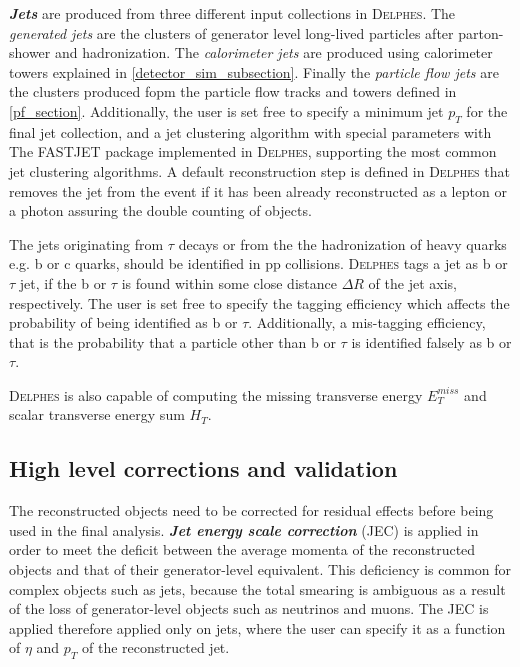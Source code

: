 {\emph{\bf{Jets}} are produced from three different input collections in \textsc{Delphes}. The \emph{generated jets} are the clusters of generator level long-lived particles after parton- shower and hadronization. The \emph{calorimeter jets} are produced using calorimeter towers explained in \autoref{detector_sim_subsection}. Finally the \emph{particle flow jets} are the clusters produced fopm the particle flow tracks and towers defined in \autoref{pf_section}. Additionally, the user is set free to specify a minimum jet $p_T$ for the final jet collection, and a jet clustering algorithm with special parameters with The FASTJET package \cite{Cacciari2012} implemented in \textsc{Delphes}, supporting the most common jet clustering algorithms. A default reconstruction step is defined in \textsc{Delphes} that removes the jet from the event if it has been already reconstructed as a lepton or a photon assuring the double counting of objects.

The jets originating from $\tau$ decays or from the the hadronization of heavy quarks e.g. b or c quarks, should be identified in pp collisions. \textsc{Delphes} tags a jet as b or $\tau$ jet, if the b or $\tau$ is found within some close distance $\Delta R$ of the jet axis, respectively. The user is set free to specify the tagging efficiency which affects the probability of being identified as b or $\tau$. Additionally, a mis-tagging efficiency, that is the probability that a particle other than b or $\tau$ is identified falsely as b or $\tau$.

\textsc{Delphes} is also capable of computing the missing transverse energy $E_T^{miss}$ and scalar transverse energy sum $H_T$.

\subsection{High level corrections and validation}

The reconstructed objects need to be corrected for residual effects before being used in the final analysis. \emph{\bf{Jet energy scale correction}} (JEC) is applied in order to meet the deficit between the average momenta of the reconstructed objects and that of their generator-level equivalent. This deficiency is common for complex objects such as jets, because the total smearing is ambiguous as a result of the loss of generator-level objects such as neutrinos and muons. The JEC is applied therefore applied only on jets, where the user can specify it as a function of $\eta$ and $p_T$ of the reconstructed jet.

}
